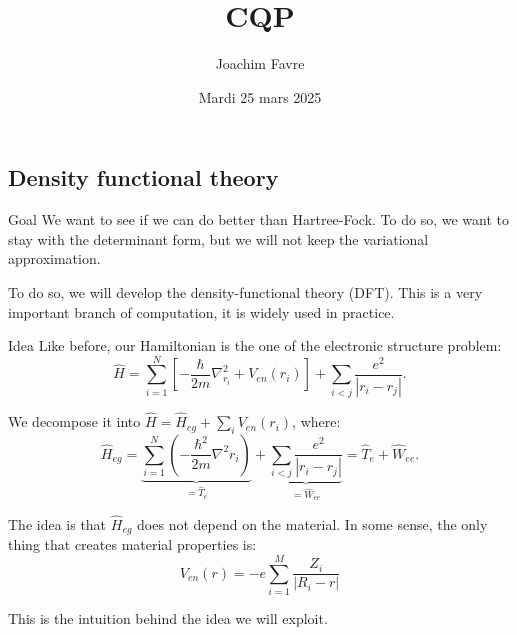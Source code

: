 \documentclass[a4paper]{article}
\title{CQP}
\author{Joachim Favre}
\date{Mardi 25 mars 2025}
\begin{document}
\maketitle


\subsection{Density functional theory}

\begin{parag}{Goal}
    We want to see if we can do better than Hartree-Fock. To do so, we want to stay with the determinant form, but we will not keep the variational approximation. 

    To do so, we will develop the density-functional theory (DFT). This is a very important branch of computation, it is widely used in practice.
\end{parag}

\begin{parag}{Idea}
    Like before, our Hamiltonian is the one of the electronic structure problem:
    \[\hat{H} = \sum_{i=1}^{N} \left[-\frac{\hbar}{2m} \nabla^2_{r_i} + V_{en}\left(r_i\right)\right] + \sum_{i < j} \frac{e^2}{\left|r_i - r_j\right|}.\]

    We decompose it into $\hat{H} = \hat{H}_{eg} + \sum_{i} V_{en}\left(r_i\right)$, where:
    \[\hat{H}_{eg} = \underbrace{\sum_{i=1}^{N} \left(-\frac{\hbar^2}{2m} \nabla^2 r_i\right)}_{= \hat{T}_e} + \underbrace{\sum_{i < j} \frac{e^2}{\left|r_i - r_j\right|}}_{= \hat{W}_{ee}} = \hat{T}_e + \hat{W}_{ee}.\]

    The idea is that $\hat{H}_{eg}$ does not depend on the material. In some sense, the only thing that creates material properties is:
    \[V_{en}\left(r\right) = - e \sum_{i=1}^{M} \frac{Z_i}{\left|R_i - r\right|}\]

    This is the intuition behind the idea we will exploit.
\end{parag}
\end{document}
